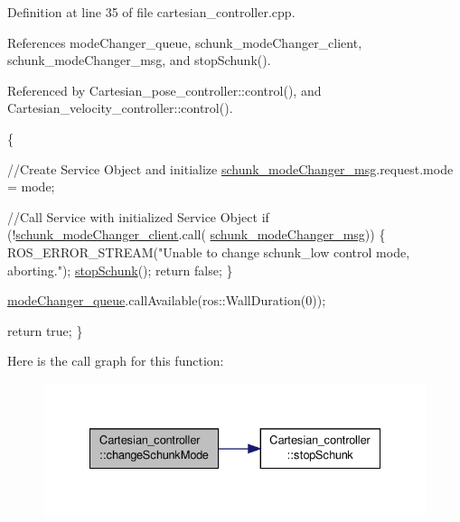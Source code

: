 Definition at line 35 of file cartesian\-\_\-controller.\-cpp.



References mode\-Changer\-\_\-queue, schunk\-\_\-mode\-Changer\-\_\-client, schunk\-\_\-mode\-Changer\-\_\-msg, and stop\-Schunk().



Referenced by Cartesian\-\_\-pose\-\_\-controller\-::control(), and Cartesian\-\_\-velocity\-\_\-controller\-::control().


\begin{DoxyCode}
                                                   \{

        \textcolor{comment}{//Create Service Object and initialize}
        \hyperlink{classCartesian__controller_a960d66580ba058d3337c89bdf8099948}{schunk\_modeChanger\_msg}.request.mode = mode;

        \textcolor{comment}{//Call Service with initialized Service Object}
        \textcolor{keywordflow}{if} (!\hyperlink{classCartesian__controller_aee1fc445b64c534847ff0012132a5d2c}{schunk\_modeChanger\_client}.call(
      \hyperlink{classCartesian__controller_a960d66580ba058d3337c89bdf8099948}{schunk\_modeChanger\_msg}))
        \{
                ROS\_ERROR\_STREAM(\textcolor{stringliteral}{"Unable to change schunk\_low control mode,
       aborting."});
                \hyperlink{classCartesian__controller_a3ba54e8b35632526c5e8eb2ab5d7de0d}{stopSchunk}();
                \textcolor{keywordflow}{return} \textcolor{keyword}{false};
        \}

        \hyperlink{classCartesian__controller_adf47dc3a09bd9650015b25870054b60d}{modeChanger\_queue}.callAvailable(ros::WallDuration(0));

        \textcolor{keywordflow}{return} \textcolor{keyword}{true};
\}
\end{DoxyCode}


Here is the call graph for this function\-:\nopagebreak
\begin{figure}[H]
\begin{center}
\leavevmode
\includegraphics[width=332pt]{classCartesian__controller_aaf006f80e89c08cf040956afbb4cf3c0_cgraph}
\end{center}
\end{figure}




